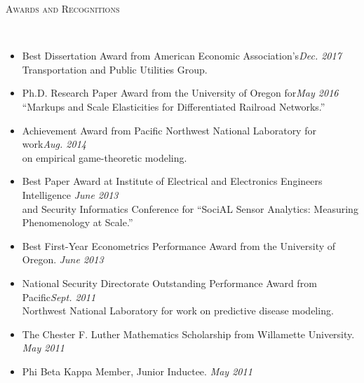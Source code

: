 \documentclass[11pt]{article}
\newenvironment{changemargin}[2]{%
  \begin{list}{}{%
    \setlength{\topsep}{0pt}%
    \setlength{\leftmargin}{#1}%
    \setlength{\rightmargin}{#2}%
    \setlength{\listparindent}{\parindent}%
    \setlength{\itemindent}{\parindent}%
    \setlength{\parsep}{\parskip}%
  }%
  \item[]}{\end{list}
}
\newcommand{\lineover}{
	\begin{changemargin}{-0.05in}{-0.05in}
		\vspace*{-8pt}
		\hrulefill \\
		\vspace*{-2pt}
	\end{changemargin}
}
\newcommand{\header}[1]{
	\begin{changemargin}{-0.5in}{-0.5in}
		\scshape{#1}\\
  	\lineover
	\end{changemargin}
}
\newenvironment{body} {
	\vspace*{-16pt}
	\begin{changemargin}{-0.25in}{-0.5in}
  }	
	{\end{changemargin}
}
\begin{document}
\smallskip
\header{Awards and Recognitions}

\begin{body}
	\vspace{14pt}
	\begin{itemize}
		\item Best Dissertation Award from American Economic Association's\hfill \emph{Dec. 2017}\\ Transportation and Public Utilities Group.
		\item Ph.D. Research Paper Award from the University of Oregon for\hfill \emph{May 2016}\\ ``Markups and Scale Elasticities for Differentiated Railroad Networks.''
		\item Achievement Award from Pacific Northwest National Laboratory for work\hfill \emph{Aug. 2014}\\ on empirical game-theoretic modeling. 
		\item Best Paper Award at Institute of Electrical and Electronics Engineers Intelligence \hfill \emph{June 2013}\\ and Security Informatics Conference for ``SociAL Sensor Analytics: Measuring\\ Phenomenology at Scale.''
		\item Best First-Year Econometrics Performance Award from the University of Oregon. \hfill \emph{June 2013}
		\item National Security Directorate Outstanding Performance Award from Pacific\hfill \emph{Sept. 2011}\\ Northwest National Laboratory for work on predictive disease modeling. 
		\item The Chester F. Luther Mathematics Scholarship from Willamette University. \hfill \emph{May 2011}
		\item Phi Beta Kappa Member, Junior Inductee. \hfill \emph{May 2011}
	\end{itemize}
\end{body}
\smallskip

\end{document}
